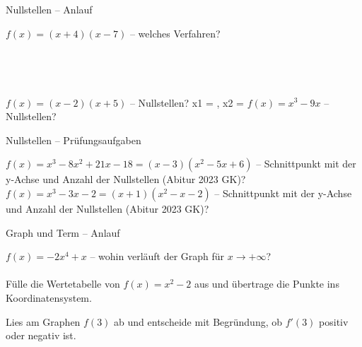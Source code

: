 \setcounter{aufgabe}{50}

\begin{aufgabe}{Nullstellen – Anlauf}
\begin{teile}
\teil $f(x) = (x + 4)(x - 7)$ – welches Verfahren? \\  \\  \\  \\  \\ 
\teil $f(x) = (x - 2)(x + 5)$ – Nullstellen? x1 = \leerfeld , x2 = \leerfeld
\teil $f(x) = x^3 - 9x$ – Nullstellen?
\end{teile}
\end{aufgabe}

\begin{aufgabe}{Nullstellen – Prüfungsaufgaben}
\begin{teile}
\teil $f(x) = x^3 - 8x^2 + 21x - 18 = (x - 3)(x^2 - 5x + 6)$ – Schnittpunkt mit der y-Achse und Anzahl der Nullstellen \hfill (Abitur 2023 GK)?
\teil $f(x) = x^3 - 3x - 2 = (x + 1)(x^2 - x - 2)$ – Schnittpunkt mit der y-Achse und Anzahl der Nullstellen \hfill (Abitur 2023 GK)?
\end{teile}
\end{aufgabe}

\begin{aufgabe}{Graph und Term – Anlauf}
\begin{teile}
\teil $f(x) = -2x^4 + x$ – wohin verläuft der Graph für $x \to +\infty$? \\  \\ 
\teil Fülle die Wertetabelle von $f(x) = x^2 - 2$ aus und übertrage die Punkte ins Koordinatensystem.

\begin{ksys}[xmin=-3,xmax=3,ymin=-3,ymax=3]\end{ksys}
\teil Lies am Graphen $f(3)$ ab und entscheide mit Begründung, ob $f'(3)$ positiv oder negativ ist.

\begin{ksys}[xmin=-1,xmax=5,ymin=-2,ymax=5,ablesen]\end{ksys}
\end{teile}
\end{aufgabe}

